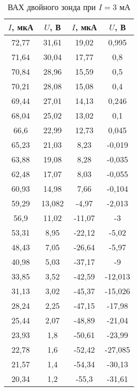 \begin{table}[h!]
    \centering
    \begin{tabular}{|c|c|c|c|}
    \hline
    $I$, мкА & $U$, В & $I$, мкА & $U$, В    \\ \hline
    72,77    & 31,61  & 19,02    & 0,995     \\ \hline
    71,64    & 30,04  & 17,77    & 0,8       \\ \hline
    70,84    & 28,96  & 15,59    & 0,5       \\ \hline
    70,21    & 28,08  & 15,08    & 0,4       \\ \hline
    69,44    & 27,01  & 14,13    & 0,246     \\ \hline
    68,04    & 25,02  & 13,02    & 0,1       \\ \hline
    66,6     & 22,99  & 12,73    & 0,045     \\ \hline
    65,23    & 21,03  & 8,23     & -0,019    \\ \hline
    63,88    & 19,08  & 8,28     & -0,035    \\ \hline
    62,48    & 17,07  & 8,03     & -0,055    \\ \hline
    60,93    & 14,98  & 7,66     & -0,104    \\ \hline
    59,29    & 13,082 & -4,97    & -2,013    \\ \hline
    56,9     & 11,02  & -11,07   & -3        \\ \hline
    53,31    & 8,95   & -22,12   & -5,02     \\ \hline
    48,43    & 7,05   & -26,64   & -5,97     \\ \hline
    40,98    & 5,03   & -37,17   & -9        \\ \hline
    33,85    & 3,52   & -42,59   & -12,013   \\ \hline
    31,13    & 3,02   & -45,37   & -15,026   \\ \hline
    28,24    & 2,25   & -47,15   & -17,98    \\ \hline
    25,44    & 2,07   & -48,89   & -21,04    \\ \hline
    23,93    & 1,8    & -50,61   & -23,99    \\ \hline
    22,78    & 1,6    & -52,42   & -27,085   \\ \hline
    21,57    & 1,4    & -54,34   & -30,13    \\ \hline
    20,34    & 1,2    & -55,3    & -31,61    \\ \hline
    \end{tabular}
    \caption{ВАХ двойного зонда при $I = 3$ мА}
    \label{VAC3}
\end{table}